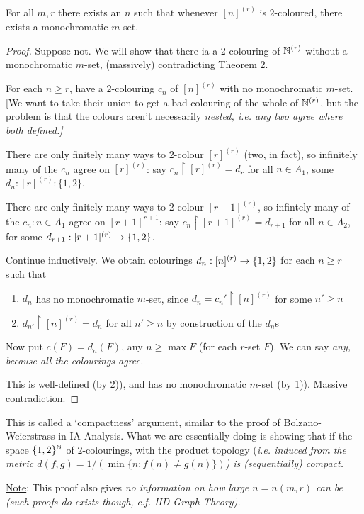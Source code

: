 \documentclass[10pt]{article}
\begin{document}
\begin{theorem}
    For all $m, r$ there exists an $n$ such that whenever $[n]^{(r)}$ is $2$-coloured, there exists a monochromatic $m$-set.
\end{theorem}
\begin{proof}
    Suppose not. We will show that there ia a $2$-colouring of $\mathbb{N}^{(r)}$ without a monochromatic $m$-set, (massively) contradicting Theorem 2.

    For each $n\ge r$, have a $2$-colouring $c_n$ of $[n]^{(r)}$ with no monochromatic $m$-set. [We want to take their union to get a bad colouring of the whole of $\mathbb{N}^{(r)}$, but the problem is that the colours aren't necessarily \it{nested}, \it{i.e.} any two agree where both defined.]

    There are only finitely many ways to $2$-colour $[r]^{(r)}$ (two, in fact), so infinitely many of the $c_n$ agree on $[r]^{(r)}$: say $c_n\restriction [r]^{(r)} = d_r$ for all $n\in A_1$, some $d_n:[r]^{(r)}:\{1,2\}$.

    There are only finitely many ways to $2$-colour $[r+1]^{(r)}$, so infintely many of the $c_n:n\in A_1$ agree on $[r+1]^{r+1}$: say $c_n\restriction [r+1]^{(r)} = d_{r+1}$ for all $n \in A_2$, for some $d_{r+1}:[r+1]^{(r)}\rightarrow \{1,2\}$.

    Continue inductively. We obtain colourings $d_n:[n]^{(r)}\rightarrow\{1,2\}$ for each $n\ge r$ such that
    \begin{enumerate}[label=\arabic*)]
        \item $d_n$ has no monochromatic $m$-set, since $d_n = c_n'\restriction [n]^{(r)}$ for some $n' \ge n$
        \item $d_{n'}\restriction [n]^{(r)} = d_n$ for all $n' \ge n$ by construction of the $d_n$s
    \end{enumerate}

    Now put $c(F) = d_n(F)$, any $n\ge \max F$ (for each $r$-set $F$). We can say \it{any}, because all the colourings agree.

    This is well-defined (by 2)), and has no monochromatic $m$-set (by 1)). Massive contradiction.
\end{proof}

\begin{remark*}[Remarks]
    This is called a `compactness' argument, similar to the proof of Bolzano-Weierstrass in IA Analysis. What we are essentially doing is showing that if the space $\{1,2\}^{\mathbb{N}}$ of $2$-colourings, with the product topology (\it{i.e.} induced from the metric $d(f,g) = 1/(\min \{n:f(n)\ne g(n)\})$) is (sequentially) compact.

    \underline{Note}: This proof also gives \it{no} information on how large $n = n(m,r)$ can be (such proofs do exists though, \it{c.f.} IID Graph Theory).
\end{remark*}
\end{document}
